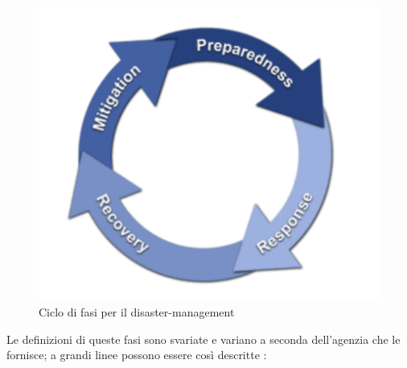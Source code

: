 \begin{figure}[H]
	\centering
	\includegraphics[scale=0.8]{ScenarioApplicativo/disaster_phase.png}
	\caption{Ciclo di fasi per il disaster-management}
	\label{fig:contesto_cycle}
\end{figure}
 \newpage
 Le definizioni di queste fasi sono svariate e variano a seconda dell'agenzia che le fornisce; a grandi linee possono essere così descritte \cite{FASI_MANAGEMENT}:
